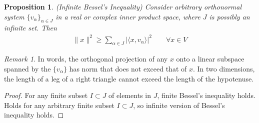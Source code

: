 \documentclass[12pt]{book}
\numberwithin{equation}{section} %
\theoremstyle{plain}
\newtheorem{prop}[thm]{Proposition}
\theoremstyle{definition}
\theoremstyle{remark}
\newtheorem*{rmk}{Remark}
\begin{document}
\begin{prop}
\emph{(Infinite Bessel's Inequality)}
Consider arbitrary orthonormal system
$\{v_\alpha\}_{\alpha\in J}$
in a real or complex inner product space,
where $J$ is possibly an infinite set.
Then
\begin{align*}
  \lVert x\rVert^2
  \geq
  \sum_{\alpha \in J}
  \big|\langle x,v_{\alpha}\rangle\big|^2
  \qquad
  \forall x\in V
\end{align*}
\end{prop}
\begin{rmk}
In words, the orthogonal projection of any $x$ onto a linear subspace
spanned by the $\{v_\alpha\}$ has norm that does not exceed that of $x$.
In two dimensions, the length of a leg of a right triangle cannot exceed
the length of the hypotenuse.
\end{rmk}
\begin{proof}
For any finite subset $I\subset J$ of elements in $J$,
finite Bessel's inequality holds.
Holds for any arbitrary finite subset $I\subset J$, so
infinite version of Bessel's inequality holds.
\end{proof}
\end{document}
